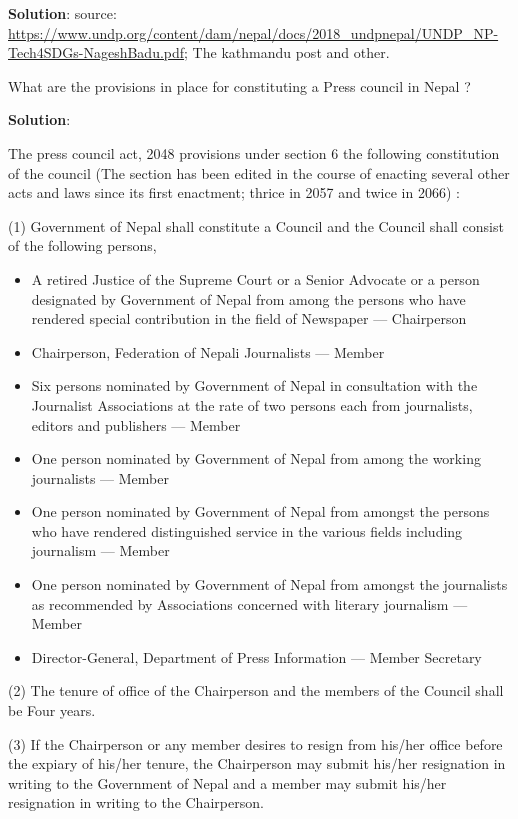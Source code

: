 \documentclass[
  openany]{book}
\newcommand{\question}{\item}
\newenvironment{solution}{ {\bfseries Solution}:}{}
\begin{document}
\begin{questions}
\begin{solution}
source: \url{https://www.undp.org/content/dam/nepal/docs/2018_undpnepal/UNDP_NP-Tech4SDGs-NageshBadu.pdf}; The kathmandu post and other.
\end{solution}

\question What are the provisions in place for constituting a Press council in Nepal ?

\begin{solution}

The press council act, 2048 provisions under section 6 the following constitution of the council (The section has been edited in the course of enacting several other acts and laws since its first enactment; thrice in 2057 and twice in 2066) :

(1) Government of Nepal shall constitute a Council and the Council shall consist of the following persons,

\begin{itemize}
\item A retired Justice of the Supreme Court or a Senior Advocate or a person designated by Government of Nepal from among the persons who have rendered special contribution in the field of Newspaper --- Chairperson
\item Chairperson, Federation of Nepali Journalists --- Member
\item Six persons nominated by Government of Nepal in consultation with the Journalist Associations at the rate of two persons each from journalists, editors and publishers --- Member
\item One person nominated by Government of Nepal from among the working journalists --- Member
\item One person nominated by Government of Nepal from amongst the persons who have rendered distinguished service in the various fields including journalism --- Member
\item One person nominated by Government of Nepal from  amongst the journalists as recommended by Associations concerned with literary journalism --- Member
\item Director-General, Department of Press Information --- Member Secretary
\end{itemize}

(2) The tenure of office of the Chairperson and the members of the Council shall be Four years.

(3) If the Chairperson or any member desires to resign from his/her office before the expiary of his/her tenure, the Chairperson may submit his/her resignation in writing to the Government of Nepal and a member may submit his/her resignation in writing to the Chairperson.


\end{solution}
\end{questions}
\end{document}
